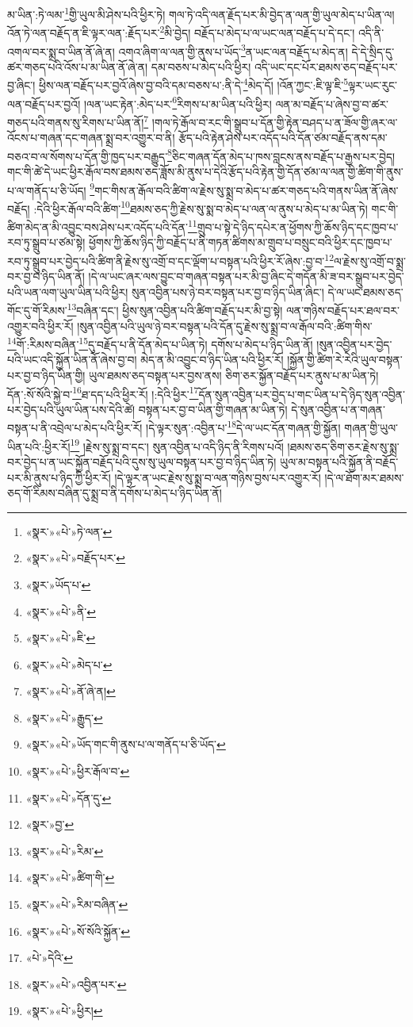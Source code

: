 མ་ཡིན་:ཏེ་ལམ་\footnote{«སྣར་»«པེ་»ཏེ་ལན་}གྱི་ཡུལ་མི་ཤེས་པའི་ཕྱིར་ཏེ། གལ་ཏེ་འདི་ལན་རྗོད་པར་མི་བྱེད་ན་ལན་གྱི་ཡུལ་མེད་པ་ཡིན་ལ། འོན་ཏེ་ལན་བརྗོད་ན་ཇི་ལྟར་ལན་:རྗོད་པར་\footnote{«སྣར་»«པེ་»བརྗོད་པར་}མི་བྱེད། བརྗོད་པ་མེད་པ་ལ་ཡང་ལན་བརྗོད་པ་དེ་དང་། འདི་ནི་འགལ་བར་སྨྲ་བ་ཡིན་ནོ་ཞེ་ན། འགའ་ཞིག་ལ་ལན་གྱི་ནུས་པ་ཡོད་\footnote{«སྣར་»ཡོད་པ་}ན་ཡང་ལན་བརྗོད་པ་མེད་ན། དེ་དེ་སྲིད་དུ་ཚར་གཅད་པའི་འོས་པ་མ་ཡིན་ནོ་ཞེ་ན། དམ་བཅས་པ་མེད་པའི་ཕྱིར། འདི་ཡང་དང་པོར་ཐམས་ཅད་བརྗོད་པར་བྱ་ཞིང་། ཕྱིས་ལན་བརྗོད་པར་བྱའོ་ཞེས་བྱ་བའི་དམ་བཅས་པ་:ནི་དེ་\footnote{«སྣར་»«པེ་»ནི་}མེད་དོ། །འོན་ཀྱང་:ཇི་ལྟ་ཇི་\footnote{«སྣར་»«པེ་»ཇི་}ལྟར་ཡང་རུང་ལན་བརྗོད་པར་བྱའོ། །ལན་ཡང་རྟེན་:མེད་པར་\footnote{«སྣར་»«པེ་»མེད་པ་}རིགས་པ་མ་ཡིན་པའི་ཕྱིར། ལན་མ་བརྗོད་པ་ཞེས་བྱ་བ་ཚར་གཅད་པའི་གནས་སུ་རིགས་པ་ཡིན་ནོ།\footnote{«སྣར་»«པེ་»ནོ་ཞེ་ན།} །གལ་ཏེ་རྒོལ་བ་རང་གི་སྒྲུབ་པ་དོན་གྱི་རྟེན་བཤད་པ་ན་ཟོལ་གྱི་ཞར་ལ་འོངས་པ་གཞན་དང་གཞན་སྨྲ་བར་འགྱུར་བ་ནི། རྩོད་པའི་རྟེན་ཤེས་པར་འདོད་པའི་དོན་ཙམ་བརྗོད་ནས་དམ་བཅའ་བ་ལ་སོགས་པ་དོན་གྱི་ཁྱད་པར་བརྒྱུད་\footnote{«སྣར་»«པེ་»རྒྱུད་}ཅིང་གཞན་དོན་མེད་པ་ཁས་བླངས་ནས་བརྗོད་པ་རྒྱས་པར་བྱེད། གང་གི་ཚེ་དེ་ཡང་ཕྱིར་རྒོལ་བས་ཐམས་ཅད་ཟློས་མི་ནུས་པ་དེའི་རྩོད་པའི་རྟེན་གྱི་དོན་ཙམ་ལ་ལན་གྱི་ཚིག་གི་ནུས་པ་ལ་གནོད་པ་ཅི་ཡོད། \footnote{«སྣར་»«པེ་»ཡོད་གང་གི་ནུས་པ་ལ་གནོད་པ་ཅི་ཡོད་}གང་གིས་ན་རྒོལ་བའི་ཚིག་ལ་རྗེས་སུ་སྨྲ་བ་མེད་པ་ཚར་གཅད་པའི་གནས་ཡིན་ནོ་ཞེས་བརྗོད། :དེའི་ཕྱིར་རྒོལ་བའི་ཚིག་\footnote{«སྣར་»«པེ་»ཕྱིར་རྒོལ་བ་}ཐམས་ཅད་ཀྱི་རྗེས་སུ་སྨ་བ་མེད་པ་ལན་ལ་ནུས་པ་མེད་པ་མ་ཡིན་ཏེ། གང་གི་ཚིག་མེད་ན་མི་འབྱུང་བས་ཤེས་པར་འདོད་པའི་དོན་\footnote{«སྣར་»«པེ་»དོན་དུ་}གྲུབ་པ་སྟེ་དེ་ཉིད་དཔེར་ན་ཕྱོགས་ཀྱི་ཆོས་ཉིད་དང་ཁྱབ་པ་རབ་ཏུ་སྒྲུབ་པ་ཙམ་སྟེ། ཕྱོགས་ཀྱི་ཆོས་ཉིད་ཀྱི་བརྗོད་པ་ནི་གཏན་ཚིགས་མ་གྲུབ་པ་བསྲུང་བའི་ཕྱིར་དང་ཁྱབ་པ་རབ་ཏུ་སྒྲུབ་པར་བྱེད་པའི་ཚིག་ནི་རྗེས་སུ་འགྲོ་བ་དང་ལྡོག་པ་བསྟན་པའི་ཕྱིར་རོ་ཞེས་:བྱ་བ་\footnote{«སྣར་»བྱ་}ལ་རྗེས་སུ་འགྲོ་བ་སྨྲ་བར་བྱ་བ་ཉིད་ཡིན་ནོ། །དེ་ལ་ཡང་ཞར་ལས་བྱུང་བ་གཞན་བསྟན་པར་མི་བྱ་ཞིང་དེ་གདོན་མི་ཟ་བར་སྒྲུབ་པར་བྱེད་པའི་ཡན་ལག་ཡུལ་ཡིན་པའི་ཕྱིར། སུན་འབྱིན་པས་ཉེ་བར་བསྟན་པར་བྱ་བ་ཉིད་ཡིན་ཞིང་། དེ་ལ་ཡང་ཐམས་ཅད་གོང་དུ་གོ་རིམས་\footnote{«སྣར་»«པེ་»རིམ་}བཞིན་དང་། ཕྱིས་སུན་འབྱིན་པའི་ཚིག་བརྗོད་པར་མི་བྱ་སྟེ། ལན་གཉིས་བརྗོད་པར་ཐལ་བར་འགྱུར་བའི་ཕྱིར་རོ། །སུན་འབྱིན་པའི་ཡུལ་ཉེ་བར་བསྟན་པའི་དོན་དུ་རྗེས་སུ་སྨྲ་བ་ལ་རྒོལ་བའི་:ཚིག་གིས་\footnote{«སྣར་»«པེ་»ཚིག་གི་}གོ་:རིམས་བཞིན་\footnote{«སྣར་»«པེ་»རིམ་བཞིན་}དུ་བརྗོད་པ་ནི་དོན་མེད་པ་ཡིན་ཏེ། དགོས་པ་མེད་པ་ཉིད་ཡིན་ནོ། །སུན་འབྱིན་པར་བྱེད་པའི་ཡང་འདི་སྐྱོན་ཡིན་ནོ་ཞེས་བྱ་བ། མེད་ན་མི་འབྱུང་བ་ཉིད་ཡིན་པའི་ཕྱིར་རོ། །སྐྱོན་གྱི་ཚིག་རེ་རེའི་ཡུལ་བསྟན་པར་བྱ་བ་ཉིད་ཡིན་གྱི། ཡུལ་ཐམས་ཅད་བསྟན་པར་བྱས་ནས། ཅིག་ཅར་སྐྱོན་བརྗོད་པར་ནུས་པ་མ་ཡིན་ཏེ། དོན་:སོ་སོའི་སྐྱེ་བ་\footnote{«སྣར་»«པེ་»སོ་སོའི་སྐྱོན་}ཐ་དད་པའི་ཕྱིར་རོ། །:དེའི་ཕྱིར་\footnote{«པེ་»དེའི་}དོན་སུན་འབྱིན་པར་བྱེད་པ་གང་ཡིན་པ་དེ་ཉིད་སུན་འབྱིན་པར་བྱེད་པའི་ཡུལ་ཡིན་པས་དེའི་ཚེ། བསྟན་པར་བྱ་བ་ཡིན་གྱི་གཞན་མ་ཡིན་ཏེ། དེ་སུན་འབྱིན་པ་ན་གཞན་བསྟན་པ་ནི་འབྲེལ་པ་མེད་པའི་ཕྱིར་རོ། །དེ་ལྟར་སུན་:འབྱིན་པ་\footnote{«སྣར་»«པེ་»འབྱིན་པར་}དེ་ལ་ཡང་དོན་གཞན་གྱི་སྐྱོན། གཞན་གྱི་ཡུལ་ཡིན་པའི་:ཕྱིར་རོ།\footnote{«སྣར་»«པེ་»ཕྱིར།} །རྗེས་སུ་སྨྲ་བ་དང་། སུན་འབྱིན་པ་འདི་ཉིད་ནི་རིགས་པའོ། །ཐམས་ཅད་ཅིག་ཅར་རྗེས་སུ་སྨྲ་བར་བྱེད་པ་ན་ཡང་སྐྱོན་བརྗོད་པའི་དུས་སུ་ཡུལ་བསྟན་པར་བྱ་བ་ཉིད་ཡིན་ཏེ། ཡུལ་མ་བསྟན་པའི་སྐྱོན་ནི་བརྗོད་པར་མི་ནུས་པ་ཉིད་ཀྱི་ཕྱིར་རོ། །དེ་ལྟར་ན་ཡང་རྗེས་སུ་སྨྲ་བ་ལན་གཉིས་བྱས་པར་འགྱུར་རོ། །དེ་ལ་ཐོག་མར་ཐམས་ཅད་གོ་རིམས་བཞིན་དུ་སྨྲ་བ་ནི་དགོས་པ་མེད་པ་ཉིད་ཡིན་ནོ། 
